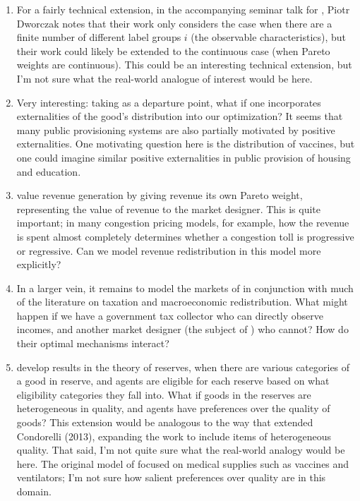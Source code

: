 \documentclass[JEL]{AEA}
\begin{document}
\begin{enumerate}
    \item For a fairly technical extension, in the accompanying seminar talk for \cite{akbarpour-2020}, Piotr Dworczak notes that their work only considers the case when there are a finite number of different label groups $i$ (the observable characteristics), but their work could likely be extended to the continuous case (when Pareto weights are continuous). This could be an interesting technical extension, but I'm not sure what the real-world analogue of interest would be here.
    
    \item Very interesting: taking \cite{akbarpour-2020} as a departure point, what if one incorporates externalities of the good's distribution into our optimization? It seems that many public provisioning systems are also partially motivated by positive externalities. One motivating question here is the distribution of vaccines, but one could imagine similar positive externalities in public provision of housing and education.
    
    \item \cite{akbarpour-2020} value revenue generation by giving revenue its own Pareto weight, representing the value of revenue to the market designer. This is quite important; in many congestion pricing models, for example, how the revenue is spent almost completely determines whether a congestion toll is progressive or regressive. Can we model revenue redistribution in this model more explicitly?

    \item In a larger vein, it remains to model the markets of \cite{dworczak-2020} in conjunction with much of the literature on taxation and macroeconomic redistribution. What might happen if we have a government tax collector who can directly observe incomes, and another market designer (the subject of \cite{akbarpour-2020}) who cannot? How do their optimal mechanisms interact?
    
    \item \cite{pathak-2020} develop results in the theory of reserves, when there are various categories of a good in reserve, and agents are eligible for each reserve based on what eligibility categories they fall into. What if goods in the reserves are heterogeneous in quality, and agents have preferences over the quality of goods? This extension would be analogous to the way that \cite{akbarpour-2020} extended Condorelli (2013), expanding the work to include items of heterogeneous quality. That said, I'm not quite sure what the real-world analogy would be here. The original model of \cite{pathak-2020} focused on medical supplies such as vaccines and ventilators; I'm not sure how salient preferences over quality are in this domain.
\end{enumerate}
\end{document}
